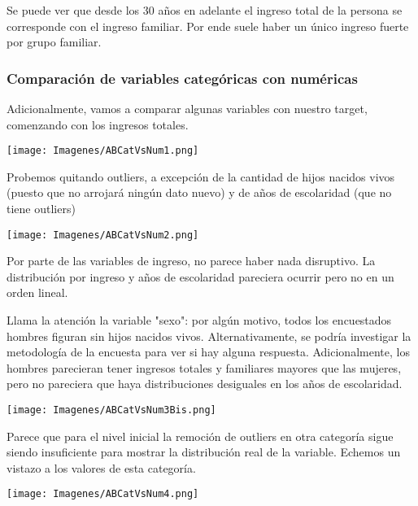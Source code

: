 \documentclass[a4paper]{article}
\begin{document}
            Se puede ver que desde los 30 años en adelante el ingreso total de la persona se corresponde con el ingreso familiar. Por ende suele haber un único ingreso fuerte por grupo familiar.
 
        \subsubsection{Comparación de variables categóricas con numéricas}
 
            Adicionalmente, vamos a comparar algunas variables con nuestro target, comenzando con los ingresos totales.
 
            \begin{center}
                \texttt{[image: Imagenes/ABCatVsNum1.png]}
            \end{center}
 
            Probemos quitando outliers, a excepción de la cantidad de hijos nacidos vivos (puesto que no arrojará ningún dato nuevo) y de años de escolaridad (que no tiene outliers)
 
            \begin{center}
                \texttt{[image: Imagenes/ABCatVsNum2.png]}
            \end{center}
 
            Por parte de las variables de ingreso, no parece haber nada disruptivo. La distribución por ingreso y años de escolaridad pareciera ocurrir pero no en un orden lineal.
 
            Llama la atención la variable "sexo": por algún motivo, todos los encuestados hombres figuran sin hijos nacidos vivos. Alternativamente, se podría investigar la metodología de la encuesta para ver si hay alguna respuesta. Adicionalmente, los hombres parecieran tener ingresos totales y familiares mayores que las mujeres, pero no pareciera que haya distribuciones desiguales en los años de escolaridad.
 
            \begin{center}
                \texttt{[image: Imagenes/ABCatVsNum3Bis.png]}
            \end{center}
 
            Parece que para el nivel inicial la remoción de outliers en otra categoría sigue siendo insuficiente para mostrar la distribución real de la variable. Echemos un vistazo a los valores de esta categoría.
 
            \begin{center}
                \texttt{[image: Imagenes/ABCatVsNum4.png]}
            \end{center}
 
\end{document}
